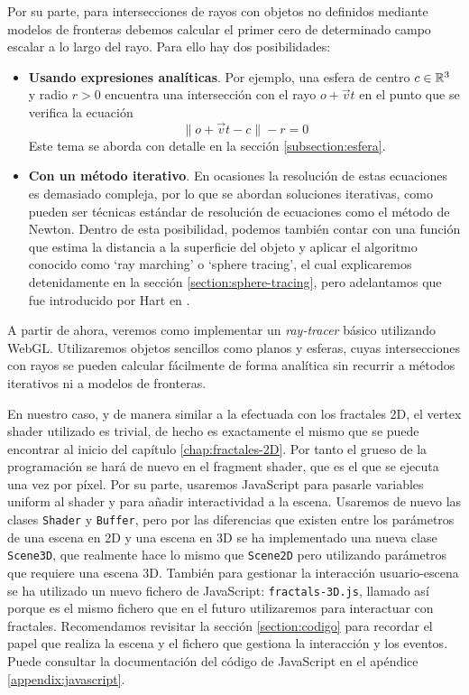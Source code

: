 Por su parte, para intersecciones de rayos con objetos no definidos mediante modelos de fronteras debemos calcular el primer cero de determinado campo escalar a lo largo del rayo. Para ello hay dos posibilidades:
\begin{itemize}
    \item \textbf{Usando expresiones analíticas}. Por ejemplo, una esfera de centro $c\in\mathbb{R}^3$ y radio $r>0$ encuentra una intersección con el rayo $o+\vec v t$ en el punto que se verifica la ecuación
    $$
    \|o+\vec v t - c\| - r = 0
    $$
    Este tema se aborda con detalle en la sección \ref{subsection:esfera}.
    \item \textbf{Con un método iterativo}. En ocasiones la resolución de estas ecuaciones es demasiado compleja, por lo que se abordan soluciones iterativas, como pueden ser técnicas estándar de resolución de ecuaciones como el método de Newton. Dentro de esta posibilidad, podemos también contar con una función que estima la distancia a la superficie del objeto y aplicar el algoritmo conocido como `ray marching' o `sphere tracing', el cual explicaremos detenidamente en la sección \ref{section:sphere-tracing}, pero adelantamos que fue introducido por Hart en \cite{Hart-1995}.
\end{itemize}

A partir de ahora, veremos como implementar un \textit{ray-tracer} básico utilizando WebGL. Utilizaremos objetos sencillos como planos y esferas, cuyas intersecciones con rayos se pueden calcular fácilmente de forma analítica sin recurrir a métodos iterativos ni a modelos de fronteras.

En nuestro caso, y de manera similar a la efectuada con los fractales 2D, el vertex shader utilizado es trivial, de hecho es exactamente el mismo que se puede encontrar al inicio del capítulo \ref{chap:fractales-2D}. Por tanto el grueso de la programación se hará de nuevo en el fragment shader, que es el que se ejecuta una vez por píxel. Por su parte, usaremos JavaScript para pasarle variables uniform al shader y para añadir interactividad a la escena. Usaremos de nuevo las clases \verb|Shader| y \verb|Buffer|, pero por las diferencias que existen entre los parámetros de una escena en 2D y una escena en 3D se ha implementado una nueva clase \verb|Scene3D|, que realmente hace lo mismo que \verb|Scene2D| pero utilizando parámetros que requiere una escena 3D. También para gestionar la interacción usuario-escena se ha utilizado un nuevo fichero de JavaScript: \verb|fractals-3D.js|, llamado así porque es el mismo fichero que en el futuro utilizaremos para interactuar con fractales. Recomendamos revisitar la sección \ref{section:codigo} para recordar el papel que realiza la escena y el fichero que gestiona la interacción y los eventos. Puede consultar la documentación del código de JavaScript en el apéndice \ref{appendix:javascript}.

